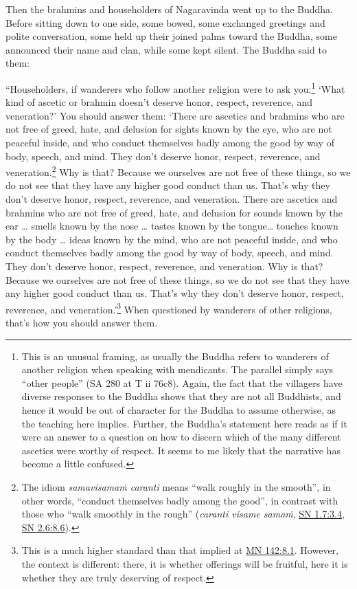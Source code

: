 \documentclass[12pt,openany]{book}%
\begin{document}
Then the brahmins and householders of Nagaravinda went up to the Buddha. Before sitting down to one side, some bowed, some exchanged greetings and polite conversation, some held up their joined palms toward the Buddha, some announced their name and clan, while some kept silent. The Buddha said to them: 

“Householders, if wanderers who follow another religion were to ask you:\footnote{This is an unusual framing, as usually the Buddha refers to wanderers of another religion when speaking with mendicants. The parallel simply says “other people” (SA 280 at T ii 76c8). Again, the fact that the villagers have diverse responses to the Buddha shows that they are not all Buddhists, and hence it would be out of character for the Buddha to assume otherwise, as the teaching here implies. Further, the Buddha’s statement here reads as if it were an answer to a question on how to discern which of the many different ascetics were worthy of respect. It seems to me likely that the narrative has become a little confused. } ‘What kind of ascetic or brahmin doesn’t deserve honor, respect, reverence, and veneration?’ You should answer them: ‘There are ascetics and brahmins who are not free of greed, hate, and delusion for sights known by the eye, who are not peaceful inside, and who conduct themselves badly among the good by way of body, speech, and mind. They don’t deserve honor, respect, reverence, and veneration.\footnote{The idiom \textit{\textsanskrit{samavisamaṁ} caranti} means “walk roughly in the smooth”, in other words, “conduct themselves badly among the good”, in contrast with those who “walk smoothly in the rough” (\textit{caranti visame \textsanskrit{samaṁ}}, \href{https://suttacentral.net/sn1.7/en/sujato\#3.4}{SN 1.7:3.4}, \href{https://suttacentral.net/sn2.6/en/sujato\#8.6}{SN 2.6:8.6}). } Why is that? Because we ourselves are not free of these things, so we do not see that they have any higher good conduct than us. That’s why they don’t deserve honor, respect, reverence, and veneration. There are ascetics and brahmins who are not free of greed, hate, and delusion for sounds known by the ear … smells known by the nose … tastes known by the tongue… touches known by the body … ideas known by the mind, who are not peaceful inside, and who conduct themselves badly among the good by way of body, speech, and mind. They don’t deserve honor, respect, reverence, and veneration. Why is that? Because we ourselves are not free of these things, so we do not see that they have any higher good conduct than us. That’s why they don’t deserve honor, respect, reverence, and veneration.’\footnote{This is a much higher standard than that implied at \href{https://suttacentral.net/mn142/en/sujato\#8.1}{MN 142:8.1}. However, the context is different: there, it is whether offerings will be fruitful, here it is whether they are truly deserving of respect. } When questioned by wanderers of other religions, that’s how you should answer them. 
\end{document}
